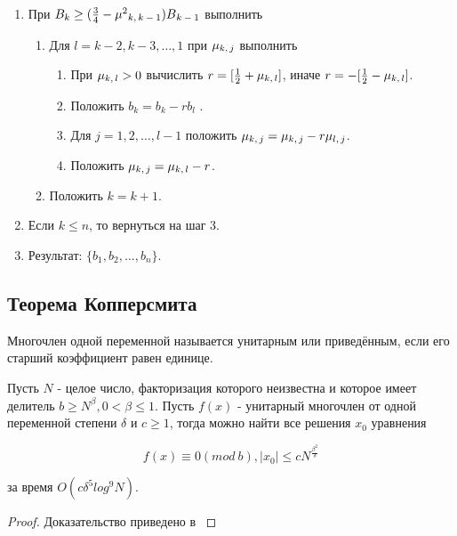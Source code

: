 \begin{enumerate}
     \item При {$ B_k \ge (\frac{3}{4} - \mu^2\textsubscript{{$k,k-1$}})B\textsubscript{{$k-1$}} $} выполнить
     
      \begin{enumerate}
       \item Для {$l=k-2,k-3,\dots,1$} при {$\mu\textsubscript{{$k,j$}}$} выполнить
       
	\begin{enumerate}
	  \item При {$ \mu\textsubscript{{$k,l$}} > 0 $} вычислить {$r=[\frac{1}{2} + \mu\textsubscript{{$k,l$}}]$}, иначе {$r=-[\frac{1}{2} - \mu\textsubscript{{$k,l$}}]$}.
	  \item Положить {$b_k=b_k - r b_l$}   .
	  \item Для {$j = 1, 2, \dots, l - 1$} положить {$\mu\textsubscript{{$k,j$}} = \mu\textsubscript{{$k,j$}} - r \mu\textsubscript{{$l,j$}}$}.
	  \item Положить {$\mu\textsubscript{{$k,j$}} = \mu\textsubscript{{$k,l$}} - r$}.
	\end{enumerate}
       
       \item  Положить {$k=k+1$}.   
      \end{enumerate}
     
     \item Если {$k \le n$}, то вернуться на шаг 3.
     \item Результат: {$\{ b_1,b_2, \dots, b_n \}$}.
    \end{enumerate}


\subsection{Теорема Копперсмита}

  \begin{definition}
    Многочлен одной переменной называется унитарным или приведённым, если его старший коэффициент равен единице.
  \end{definition}

  \begin{theorem}
   Пусть $N$ - целое число, факторизация которого неизвестна и которое имеет делитель {$b \ge N^\beta, 0 < \beta \le 1$}. Пусть {$f(x)$} - 
   унитарный многочлен от одной переменной степени {$\delta$} и {$c \ge 1$}, тогда можно найти все решения {$x_0$} уравнения
   
    \begin{equation}
      f(x) \equiv 0(mod \: b), |x_0| \le c N^{\frac{\beta^2}{\delta}}
    \end{equation}

    за время {$O(c \delta^5 log^9 N)$}.
    
    \begin{proof}
     Доказательство приведено в \cite[страницы 320-350]{may10}
    \end{proof}

  \end{theorem}
  
